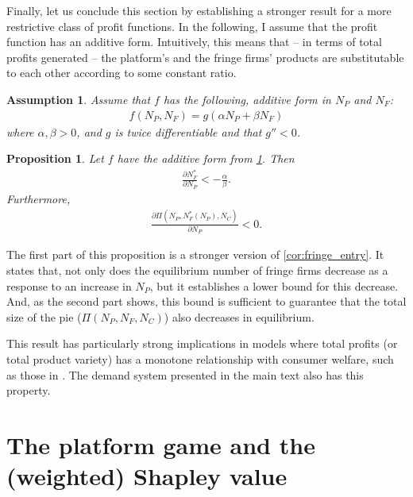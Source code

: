 \documentclass[a4paper]{article}
\newtheorem{proposition}{Proposition}
\newtheorem{assumption}{Assumption}
\begin{document}
Finally, let us conclude this section by establishing a stronger result for a more restrictive class of profit functions.
In the following, I assume that the profit function has an additive form.
Intuitively, this means that -- in terms of total profits generated -- the platform's and the fringe firms' products are substitutable to each other according to some constant ratio.
\begin{assumption}
    \label{ass:additive_profit}
    Assume that $f$ has the following, additive form in $N_P$ and $N_F$:
    \begin{align*}
        f(N_P, N_F) = g(\alpha N_P + \beta N_F)
    \end{align*}
    where $\alpha, \beta > 0$, and $g$ is twice differentiable and that $g'' < 0$.
\end{assumption}

\begin{proposition}
    \label{prop:aggregate_size_additive}
    Let $f$ have the additive form from \cref{ass:additive_profit}.
    Then
    \begin{align*}
        \frac{\partial N_F^*}{\partial N_P} < -\frac{\alpha}{\beta}.
    \end{align*}
    Furthermore,
    \begin{align*}
        \frac{\partial \Pi(N_P, N_F^*(N_P), N_C)}{\partial N_P} < 0.
    \end{align*}
\end{proposition}

The first part of this proposition is a stronger version of \cref{cor:fringe_entry}.
It states that, not only does the equilibrium number of fringe firms decrease as a response to an increase in $N_P$, but it establishes a lower bound for this decrease.
And, as the second part shows, this bound is sufficient to guarantee that the total size of the pie ($\Pi(N_P, N_F, N_C)$) also decreases in equilibrium.

This result has particularly strong implications in models where total profits (or total product variety) has a monotone relationship with consumer welfare, such as those in \textcite{anderson2020aggregative}.
The demand system presented in the main text also has this property.


\section{The platform game and the (weighted) Shapley value}
\label{sec:cooperative_game}
\end{document}
